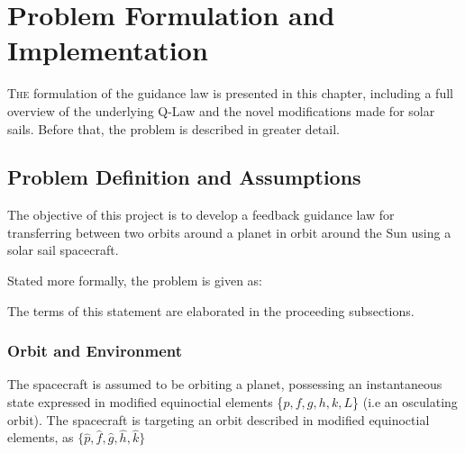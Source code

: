 \chapter{Problem Formulation and Implementation}

\lettrine{T}{he} formulation of the guidance law is presented in this chapter, including a full overview of the underlying Q-Law and the novel modifications made for solar sails. Before that, the problem is described in greater detail.

\section{Problem Definition and Assumptions}
The objective of this project is to develop a feedback guidance law for transferring between two orbits around a planet in orbit around the Sun using a solar sail spacecraft.

Stated more formally, the problem is given as:


The terms of this statement are elaborated in the proceeding subsections.

\subsection{Orbit and Environment}
\label{sec:orbit_environment}
The spacecraft is assumed to be orbiting a planet, possessing an instantaneous state expressed in modified equinoctial elements \{\(p, f, g, h, k, L\)\} (i.e an osculating orbit). The spacecraft is targeting an orbit described in modified equinoctial elements, as \(\{\hat{p}, \hat{f}, \hat{g}, \hat{h}, \hat{k}\}\)

